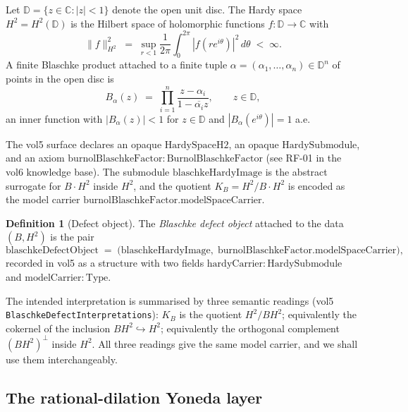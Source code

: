 \documentclass[12pt]{article}
\theoremstyle{definition}
\newtheorem{definition}[theorem]{Definition}
\theoremstyle{remark}
\newcommand{\HardyTwo}{H^{2}}
\newcommand{\BS}{B}
\newcommand{\KB}{K_{B}}
\newcommand{\D}{\mathbb{D}}
\newcommand{\C}{\mathbb{C}}
\begin{document}
Let $\D = \{ z \in \C : |z| < 1 \}$ denote the open unit disc. The Hardy space $H^{2} = H^{2}(\D)$ is the Hilbert space of holomorphic functions $f : \D \to \C$ with
\begin{equation}\label{eq:hardyNorm}
  \| f \|_{H^{2}}^{2} \;=\; \sup_{r < 1} \frac{1}{2\pi} \int_{0}^{2\pi} |f(re^{i\theta})|^{2}\, d\theta \;<\; \infty.
\end{equation}
A finite Blaschke product attached to a finite tuple $\alpha = (\alpha_{1}, \dots, \alpha_{n}) \in \D^{n}$ of points in the open disc is
\begin{equation}\label{eq:finiteBlaschke}
  B_{\alpha}(z) \;=\; \prod_{i=1}^{n} \frac{z - \alpha_{i}}{1 - \overline{\alpha_{i}} z}, \qquad z \in \D,
\end{equation}
an inner function with $|B_{\alpha}(z)| < 1$ for $z \in \D$ and $|B_{\alpha}(e^{i\theta})| = 1$ a.e.

The vol5 surface declares an opaque $\mathrm{HardySpaceH2}$, an opaque $\mathrm{HardySubmodule}$, and an axiom $\mathrm{burnolBlaschkeFactor} : \mathrm{BurnolBlaschkeFactor}$ (see RF-01 in the vol6 knowledge base). The submodule $\mathrm{blaschkeHardyImage}$ is the abstract surrogate for $B \cdot H^{2}$ inside $H^{2}$, and the quotient $\KB = H^{2} / B \cdot H^{2}$ is encoded as the model carrier $\mathrm{burnolBlaschkeFactor.modelSpaceCarrier}$.

\begin{definition}[Defect object]\label{def:defectObject}
The \emph{Blaschke defect object} attached to the data $(\BS, \HardyTwo)$ is the pair
\begin{equation}\label{eq:defectObjectDef}
  \mathrm{blaschkeDefectObject}
  \;=\;
  \big( \mathrm{blaschkeHardyImage},\;
        \mathrm{burnolBlaschkeFactor.modelSpaceCarrier} \big),
\end{equation}
recorded in vol5 as a structure with two fields $\mathrm{hardyCarrier} : \mathrm{HardySubmodule}$ and $\mathrm{modelCarrier} : \mathrm{Type}$.
\end{definition}

The intended interpretation is summarised by three semantic readings (vol5 \texttt{BlaschkeDefectInterpretations}): $K_{B}$ is the quotient $H^{2}/BH^{2}$; equivalently the cokernel of the inclusion $BH^{2} \hookrightarrow H^{2}$; equivalently the orthogonal complement $(BH^{2})^{\perp}$ inside $H^{2}$. All three readings give the same model carrier, and we shall use them interchangeably.

\subsection{The rational-dilation Yoneda layer}
\end{document}
